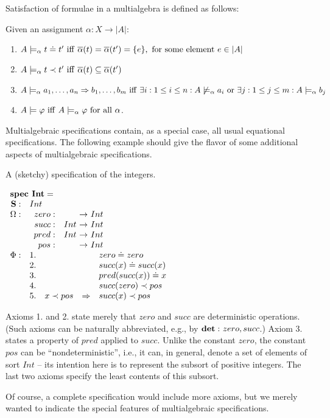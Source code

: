 Satisfaction of formulae in a multialgebra is defined as follows:
\begin{definition}\label{de:sat}
Given an assignment $\alpha:X\to|A|$:
\begin{enumerate}\MyLPar
\item $A \models_\alpha t \mathrel{\dot{=} }  t'\ {\rm iff\ } \overline{\alpha}(t)
=\overline{\alpha}(t') = \{e\},\ {\rm for\ some\ element\ } e \in |A|$
\item $A \models_\alpha t \prec t'\ {\rm iff\ } \ovr{\alpha}(t) \subseteq \overline{\alpha}(t')$
\item $ A \models_\alpha a_1 , \ldots ,a_n \Rightarrow  b_1 , \ldots ,b_m\ {\rm iff\ }
\exists i: 1 \leq i \leq n : A \not\models_\alpha a_i\ {\rm or\ } \exists j: 1 \leq j \leq m : A \models_\alpha b_j$
\item $A \models \varphi\ {\rm iff\ } A \models_\alpha \varphi\ {\rm for\ all\ } \alpha$.
\end{enumerate}
\end{definition}
%
Multialgebraic specifications contain, as a special case, all usual equational
specifications. 
The following example should give the flavor of some additional aspects
of multialgebraic specifications.
\begin{example}
A (sketchy) specification of the integers.

\( 
	\spec{
	\tit{\mbox{\bf spec\ Int}=} \\
		\spSort{Int}
		\spOp{ zero: && Int\\
			succ: & Int & Int\\
			 pred: &Int & Int \\
			 pos: & & Int}
		\Phi:
			&1.& && zero \eleq zero \\
			&2.& && succ(x) \eleq succ(x)\\
			&3.& && pred(succ(x)) \eleq x\\
			&4.& && succ(zero) \prec pos\\
			&5.& x\prec pos &\To& succ(x) \prec pos\\
	}
\)

\noindent
Axioms 1. and 2. state merely that $zero$ and $succ$ are deterministic
operations. (Such axioms can be naturally abbreviated, e.g., by ${\bf det:}\ 
zero,succ$.)
Axiom 3. states a property of $pred$ applied to $succ$. 
Unlike the constant
$zero$, the constant $pos$ can
be ``nondeterministic'', i.e., it can, in general, denote a set of elements
of sort $Int$  -- its
intention here is to represent the subsort of positive integers.
The last two axioms specify the least contents of this subsort.
\end{example}
Of course, a complete specification would include more axioms, but we merely
wanted to indicate the special features of multialgebraic specifications. 

